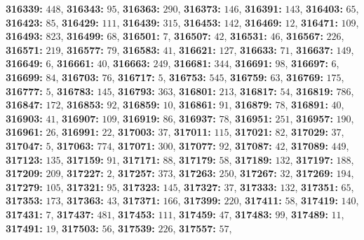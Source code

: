 \textsf{\bfseries 316339:} $448$, \textsf{\bfseries 316343:} $95$, \textsf{\bfseries 316363:} $290$, \textsf{\bfseries 316373:} $146$, \textsf{\bfseries 316391:} $143$, \textsf{\bfseries 316403:} $65$, \textsf{\bfseries 316423:} $85$, \textsf{\bfseries 316429:} $111$, \textsf{\bfseries 316439:} $315$, \textsf{\bfseries 316453:} $142$, \textsf{\bfseries 316469:} $12$, \textsf{\bfseries 316471:} $109$, \textsf{\bfseries 316493:} $823$, \textsf{\bfseries 316499:} $68$, \textsf{\bfseries 316501:} $7$, \textsf{\bfseries 316507:} $42$, \textsf{\bfseries 316531:} $46$, \textsf{\bfseries 316567:} $226$, \textsf{\bfseries 316571:} $219$, \textsf{\bfseries 316577:} $79$, \textsf{\bfseries 316583:} $41$, \textsf{\bfseries 316621:} $127$, \textsf{\bfseries 316633:} $71$, \textsf{\bfseries 316637:} $149$, \textsf{\bfseries 316649:} $6$, \textsf{\bfseries 316661:} $40$, \textsf{\bfseries 316663:} $249$, \textsf{\bfseries 316681:} $344$, \textsf{\bfseries 316691:} $98$, \textsf{\bfseries 316697:} $6$, \textsf{\bfseries 316699:} $84$, \textsf{\bfseries 316703:} $76$, \textsf{\bfseries 316717:} $5$, \textsf{\bfseries 316753:} $545$, \textsf{\bfseries 316759:} $63$, \textsf{\bfseries 316769:} $175$, \textsf{\bfseries 316777:} $5$, \textsf{\bfseries 316783:} $145$, \textsf{\bfseries 316793:} $363$, \textsf{\bfseries 316801:} $213$, \textsf{\bfseries 316817:} $54$, \textsf{\bfseries 316819:} $786$, \textsf{\bfseries 316847:} $172$, \textsf{\bfseries 316853:} $92$, \textsf{\bfseries 316859:} $10$, \textsf{\bfseries 316861:} $91$, \textsf{\bfseries 316879:} $78$, \textsf{\bfseries 316891:} $40$, \textsf{\bfseries 316903:} $41$, \textsf{\bfseries 316907:} $109$, \textsf{\bfseries 316919:} $86$, \textsf{\bfseries 316937:} $78$, \textsf{\bfseries 316951:} $251$, \textsf{\bfseries 316957:} $190$, \textsf{\bfseries 316961:} $26$, \textsf{\bfseries 316991:} $22$, \textsf{\bfseries 317003:} $37$, \textsf{\bfseries 317011:} $115$, \textsf{\bfseries 317021:} $82$, \textsf{\bfseries 317029:} $37$, \textsf{\bfseries 317047:} $5$, \textsf{\bfseries 317063:} $774$, \textsf{\bfseries 317071:} $300$, \textsf{\bfseries 317077:} $92$, \textsf{\bfseries 317087:} $42$, \textsf{\bfseries 317089:} $449$, \textsf{\bfseries 317123:} $135$, \textsf{\bfseries 317159:} $91$, \textsf{\bfseries 317171:} $88$, \textsf{\bfseries 317179:} $58$, \textsf{\bfseries 317189:} $132$, \textsf{\bfseries 317197:} $188$, \textsf{\bfseries 317209:} $209$, \textsf{\bfseries 317227:} $2$, \textsf{\bfseries 317257:} $373$, \textsf{\bfseries 317263:} $250$, \textsf{\bfseries 317267:} $32$, \textsf{\bfseries 317269:} $194$, \textsf{\bfseries 317279:} $105$, \textsf{\bfseries 317321:} $95$, \textsf{\bfseries 317323:} $145$, \textsf{\bfseries 317327:} $37$, \textsf{\bfseries 317333:} $132$, \textsf{\bfseries 317351:} $65$, \textsf{\bfseries 317353:} $173$, \textsf{\bfseries 317363:} $43$, \textsf{\bfseries 317371:} $166$, \textsf{\bfseries 317399:} $220$, \textsf{\bfseries 317411:} $58$, \textsf{\bfseries 317419:} $140$, \textsf{\bfseries 317431:} $7$, \textsf{\bfseries 317437:} $481$, \textsf{\bfseries 317453:} $111$, \textsf{\bfseries 317459:} $47$, \textsf{\bfseries 317483:} $99$, \textsf{\bfseries 317489:} $11$, \textsf{\bfseries 317491:} $19$, \textsf{\bfseries 317503:} $56$, \textsf{\bfseries 317539:} $226$, \textsf{\bfseries 317557:} $57$, 
